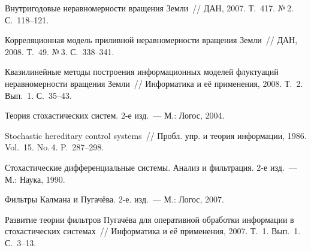 \begin{multicols}{2}
{{\begin{thebibliography}{99}
Внутригодовые неравномерности вращения Земли~// ДАН,
2007.  Т.~417. №\,2. С.~118--121.

Корреляционная модель приливной неравномерности вращения Земли~//
ДАН, 2008. Т.~49. №\,3. С.~338--341.

Квазилинейные методы построения
информационных моделей флуктуаций неравномерности вращения Земли~//
Информатика и её применения, 2008. Т.~2. Вып.~1. С.~35--43.

 Теория стохастических систем. 2-е
изд.~--- М.:  Логос, 2004.

Stochastic hereditary control systems~//  Пробл. упр. и теория информации, 
1986. Vol.~15. No.\,4. P.~287--298.

Стохастические дифференциальные системы.  Анализ и фильтрация. 2-е изд.~---
М.: Наука, 1990.

Фильтры Калмана и Пугачёва. 2-е. изд.~--- М.: Логос, 2007.

  \label{end\stat}

Развитие теории фильтров Пугачёва для оперативной обработки 
информации в стохастических системах~//
Информатика и её применения, 2007. Т.~1. Вып.~1. С.~3--13.
\end{thebibliography}
}
}
\end{multicols}  
